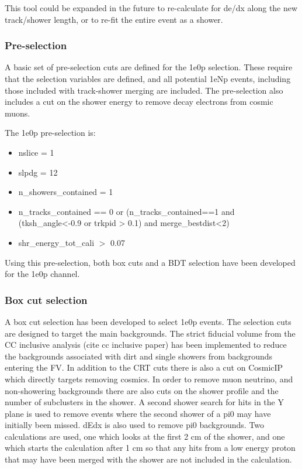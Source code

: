 \documentclass[a4paper]{article}
\begin{document}
This tool could be expanded in the future to re-calculate for de/dx along the new track/shower length, or to re-fit the entire event as a shower.

\subsubsection{Pre-selection}
A basic set of pre-selection cuts are defined for the 1e0p selection.  These require that the selection variables are defined, and all potential 1eNp events, including those included with track-shower merging are included.  The pre-selection also includes a cut on the shower energy to remove decay electrons from cosmic muons.

The 1e0p pre-selection is:
\begin{itemize}
    \item nslice = 1
    \item slpdg = 12
    \item n\_showers\_contained = 1
    \item n\_tracks\_contained == 0 or (n\_tracks\_contained==1 and (tksh\_angle<-0.9 or trkpid > 0.1) and merge\_bestdist<2)
    \item shr\_energy\_tot\_cali $>$ 0.07
\end{itemize}

Using this pre-selection, both box cuts and a BDT selection have been developed for the 1e0p channel.

\subsubsection{Box cut selection}

A box cut selection has been developed to select 1e0p events.  The selection cuts are designed to target the main backgrounds.  The strict fiducial volume from the CC inclusive analysis (cite cc inclusive paper) has been implemented to reduce the backgrounds associated with dirt and single showers from backgrounds entering the FV.   In addition to the CRT cuts there is also a cut on CosmicIP which directly targets removing cosmics.  In order to remove muon neutrino, and non-showering backgrounds there are also cuts on the shower profile and the number of subclusters in the shower.  A second shower search for hits in the Y plane is used to remove events where the second shower of a pi0 may have initially been missed.  dEdx is also used to remove pi0 backgrounds.  Two calculations are used, one which looks at the first 2 cm of the shower, and one which starts the calculation after 1 cm so that any hits from a low energy proton that may have been merged with the shower are not included in the calculation.
\end{document}
